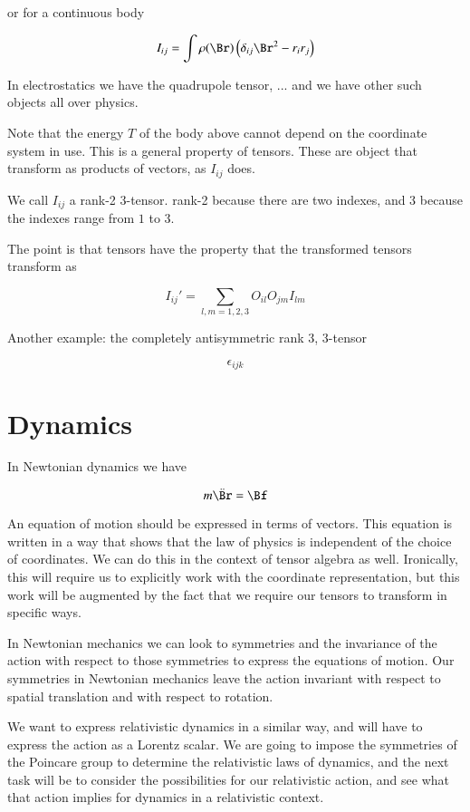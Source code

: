 or for a continuous body

\begin{equation}\label{eqn:relativisticElectrodynamicsL6:220}
I_{ij} = \int \rho(\Br) \left(\delta_{ij} \Br^2 - r_{i} r_{j} \right)
\end{equation}

In electrostatics we have the quadrupole tensor, ... and we have other such objects all over physics.

Note that the energy $T$ of the body above cannot depend on the coordinate system in use.  This is a general property of tensors.  These are object that transform as products of vectors, as $I_{ij}$ does.  

We call $I_{ij}$ a rank-2 3-tensor.  rank-2 because there are two indexes, and 3 because the indexes range from $1$ to $3$.

The point is that tensors have the property that the transformed tensors transform as

\begin{equation}\label{eqn:relativisticElectrodynamicsL6:230}
I_{ij}' = \sum_{l, m = 1,2,3} O_{il} O_{jm} I_{lm}
\end{equation}

Another example: the completely antisymmetric rank 3, 3-tensor

\begin{equation}\label{eqn:relativisticElectrodynamicsL6:240}
\epsilon_{ijk}
\end{equation}

\section{Dynamics}

In Newtonian dynamics we have 

\begin{equation}\label{eqn:relativisticElectrodynamicsL6:250}
m \ddot{\Br} = \Bf
\end{equation}

An equation of motion should be expressed in terms of vectors.  This equation is written in a way that shows that the law of physics is independent of the choice of coordinates.  We can do this in the context of tensor algebra as well.  Ironically, this will require us to explicitly work with the coordinate representation, but this work will be augmented by the fact that we require our tensors to transform in specific ways.

In Newtonian mechanics we can look to symmetries and the invariance of the action with respect to those symmetries to express the equations of motion.  Our symmetries in Newtonian mechanics leave the action invariant with respect to spatial translation and with respect to rotation.

We want to express relativistic dynamics in a similar way, and will have to express the action as a Lorentz scalar.  We are going to impose the symmetries of the Poincare group to determine the relativistic laws of dynamics, and the next task will be to consider the possibilities for our relativistic action, and see what that action implies for dynamics in a relativistic context.

\EndArticle
